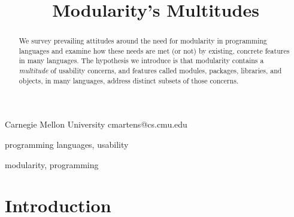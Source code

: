 \documentclass{sigplanconf}
\begin{document}
\setlength{\pdfpageheight}{\paperheight}
\setlength{\pdfpagewidth}{\paperwidth}






\title{Modularity's Multitudes}

           {Carnegie Mellon University}
           {cmartens@cs.cmu.edu}

\maketitle

\begin{abstract}
We survey prevailing attitudes around the need for modularity in
programming languages and examine how these needs are met (or not) by
existing, concrete features in many languages. The hypothesis we introduce
is that modularity contains a {\em multitude} of usability concerns,
and features called modules, packages, libraries, and objects, in many
languages, address distinct subsets of those concerns. 
\end{abstract}


\terms
programming languages, usability

\keywords
modularity, programming

\section{Introduction}
\end{document}
